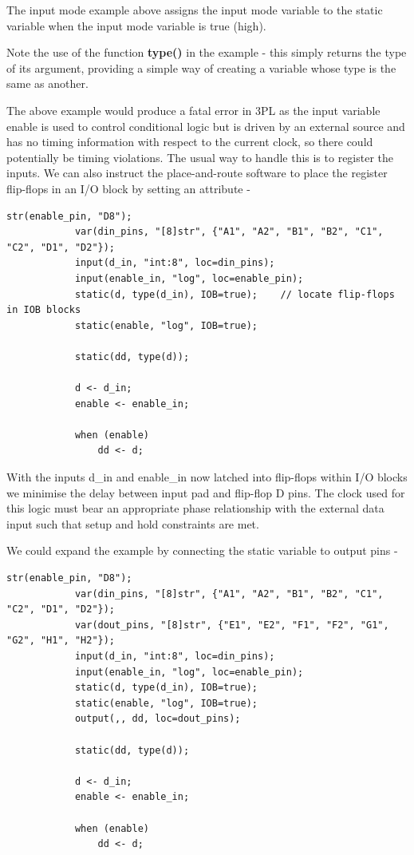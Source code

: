         The input mode example above assigns the input mode variable  to
        the static variable  when the input mode variable  is true
        (high).

        Note the use of the function {\bf type()} in the example - this simply returns the
        type of its argument, providing a simple way of creating a variable whose type
        is the same as another.

        The above example would produce a fatal error in 3PL as the input variable {\var
        enable} is used to control conditional logic but is driven by an external
        source and has no timing information with respect to the current clock, so
        there could potentially be timing violations. The usual way to handle this
        is to register the inputs. We can also instruct the place-and-route
        software to place the register flip-flops in an I/O block by setting
        an attribute -

        \begin{lstlisting}[language=threepl]
            str(enable_pin, "D8");
            var(din_pins, "[8]str", {"A1", "A2", "B1", "B2", "C1", "C2", "D1", "D2"});
            input(d_in, "int:8", loc=din_pins);
            input(enable_in, "log", loc=enable_pin);
            static(d, type(d_in), IOB=true);    // locate flip-flops in IOB blocks
            static(enable, "log", IOB=true);

            static(dd, type(d));

            d <- d_in;
            enable <- enable_in;

            when (enable)
                dd <- d;
        \end{lstlisting}
        With the inputs d\_in and enable\_in now latched into flip-flops within I/O blocks
        we minimise the delay between input pad and flip-flop D pins. The clock used for
        this logic must bear an appropriate phase relationship with the external data input
        such that setup and hold constraints are met.

        We could expand the example by connecting the static variable {} to output
        pins -
        \begin{lstlisting}[language=threepl]
            str(enable_pin, "D8");
            var(din_pins, "[8]str", {"A1", "A2", "B1", "B2", "C1", "C2", "D1", "D2"});
            var(dout_pins, "[8]str", {"E1", "E2", "F1", "F2", "G1", "G2", "H1", "H2"});
            input(d_in, "int:8", loc=din_pins);
            input(enable_in, "log", loc=enable_pin);
            static(d, type(d_in), IOB=true);
            static(enable, "log", IOB=true);
            output(,, dd, loc=dout_pins);

            static(dd, type(d));

            d <- d_in;
            enable <- enable_in;

            when (enable)
                dd <- d;
        \end{lstlisting}

